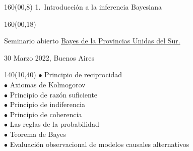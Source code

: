 \documentclass[shownotes,aspectratio=169]{beamer}
\begin{document}
\begin{frame}
\begin{textblock}{160}(00,8)
\centering
\LARGE 1.\ Introducción a la inferencia Bayesiana 
\end{textblock}

\begin{textblock}{160}(00,18) \centering

Seminario abierto \href{https://github.com/BayesDeLasProvinciasUnidasDelSur/curso}{Bayes de la Provincias Unidas del Sur.}

30 Marzo 2022, Buenos Aires
\end{textblock}

\begin{textblock}{140}(10,40) 
$\bullet$ Principio de reciprocidad \\
$\bullet$ Axiomas de Kolmogorov \\
$\bullet$ Principio de razón suficiente \\
$\bullet$ Principio de indiferencia \\
$\bullet$ Principio de coherencia \\
$\bullet$ Las reglas de la probabilidad \\
$\bullet$ Teorema de Bayes \\
$\bullet$ Evaluación observacional de modelos causales alternativos \\
\end{textblock}

\end{frame}
\end{document}
